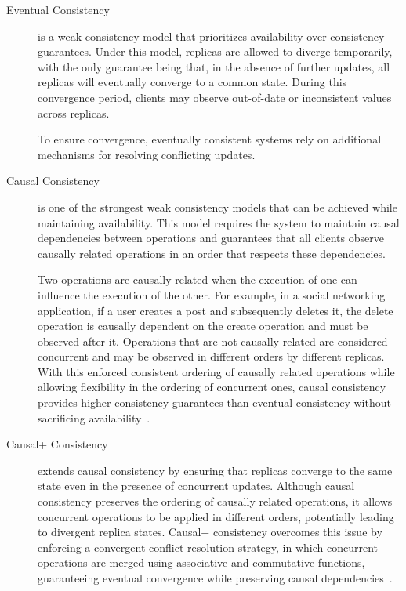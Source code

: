 \begin{description}
    \item[Eventual Consistency] is a weak consistency model that prioritizes availability over consistency guarantees. Under this model, replicas are allowed to diverge temporarily, with the only guarantee being that, in the absence of further updates, all replicas will eventually converge to a common state. During this convergence period, clients may observe out-of-date or inconsistent values across replicas.

          To ensure convergence, eventually consistent systems rely on additional mechanisms for resolving conflicting updates.
    \item[Causal Consistency] is one of the strongest weak consistency models that can be achieved while maintaining availability. This model requires the system to maintain causal dependencies between operations and guarantees that all clients observe causally related operations in an order that respects these dependencies.

          Two operations are causally related when the execution of one can influence the execution of the other. For example, in a social networking application, if a user creates a post and subsequently deletes it, the delete operation is causally dependent on the create operation and must be observed after it. Operations that are not causally related are considered concurrent and may be observed in different orders by different replicas. With this enforced consistent ordering of causally related operations while allowing flexibility in the ordering of concurrent ones, causal consistency provides higher consistency guarantees than eventual consistency without sacrificing availability~\cite{borrego2025convergence, lloyd2011eventual}.
    \item[Causal+ Consistency] extends causal consistency by ensuring that replicas converge to the same state even in the presence of concurrent updates. Although causal consistency preserves the ordering of causally related operations, it allows concurrent operations to be applied in different orders, potentially leading to divergent replica states. Causal+ consistency overcomes this issue by enforcing a convergent conflict resolution strategy, in which concurrent operations are merged using associative and commutative functions, guaranteeing eventual convergence while preserving causal dependencies~\cite{lloyd2011eventual}.
\end{description}

